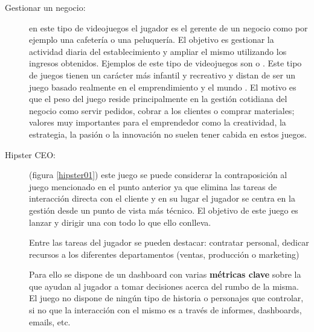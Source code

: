 \begin{description}
         \item[Gestionar un negocio:] en este tipo de videojuegos el jugador es el gerente de un negocio como por ejemplo una cafetería o una peluquería. El objetivo es gestionar la actividad diaria del establecimiento y ampliar el mismo utilizando los ingresos obtenidos. Ejemplos de este tipo de videojuegos son  o . Este tipo de juegos tienen un carácter más infantil y recreativo y distan de ser un juego basado realmente en el emprendimiento y el mundo . El motivo es que el peso del juego reside principalmente en la gestión cotidiana del negocio como servir pedidos, cobrar a los clientes o comprar materiales; valores muy importantes para el emprendedor como la creatividad, la estrategia, la pasión o la innovación no suelen tener cabida en estos juegos.
         

	\item[Hipster CEO:] (figura  \ref{hipster01}) este juego se puede considerar la contraposición al juego mencionado en el punto anterior ya que elimina las tareas de interacción directa con el cliente y en su lugar el jugador se centra en la gestión desde un punto de vista más técnico. El objetivo de este juego es lanzar y dirigir una  con todo lo que ello conlleva.
	
Entre las tareas del jugador se pueden destacar: contratar personal, dedicar recursos a los diferentes departamentos (ventas, producción o marketing) 

Para ello se dispone de un dashboard con varias \textbf{métricas clave} sobre la  que ayudan al jugador a tomar decisiones acerca del rumbo de la misma. El juego no dispone de ningún tipo de historia o personajes que controlar, si no que la interacción con el mismo es a través de informes, dashboards, emails, etc.


\end{description}
